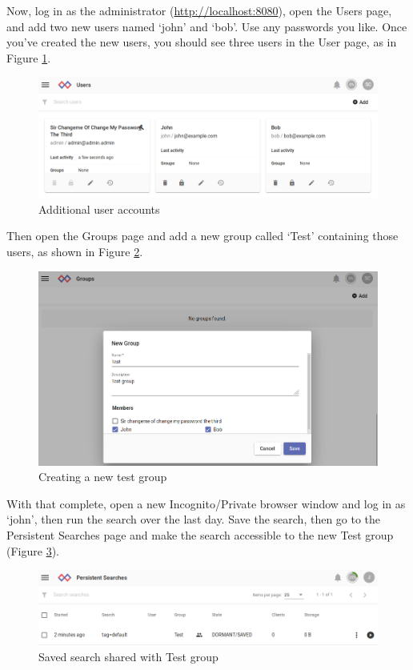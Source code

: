 Now, log in as the administrator (\href{http://localhost:8080}{http://localhost:8080}), open the Users page, and add two new
users named `john' and `bob'. Use any passwords you like. Once you've
created the new users, you should see three users in the User page, as in Figure \ref{fig:lab-john-bob}.

\begin{figure}
	\includegraphics{images/lab-john-bob.png}
	\caption{Additional user accounts}
	\label{fig:lab-john-bob}
\end{figure}

Then open the Groups page and add a new group called `Test' containing
those users, as shown in Figure \ref{fig:lab-test-group}.

\begin{figure}
	\includegraphics{images/lab-test-group.png}
	\caption{Creating a new test group}
	\label{fig:lab-test-group}
\end{figure}

With that complete, open a new Incognito/Private browser window and log
in as `john', then run the search  over the last day. Save
the search, then go to the Persistent Searches page and make the search
accessible to the new Test group (Figure \ref{fig:lab-shared-search}).

\begin{figure}
	\includegraphics{images/lab-shared-search.png}
	\caption{Saved search shared with Test group}
	\label{fig:lab-shared-search}
\end{figure}

